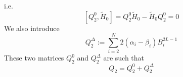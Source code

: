 \documentclass[11pt]{article}
\numberwithin{equation}{section}
\numberwithin{equation}{subsection}
\begin{document}
i.e.
\begin{equation}
\left[Q_{2}^{0},\widetilde{H}_{0}\right]=Q_{2}^{0}\widetilde{H}_{0}-\widetilde{H}_{0}Q_{2}^{0}=0
\end{equation}
We also introduce 
\begin{equation}
Q_{2}^{\Delta}:=\sum_{i=2}^{N}2(\alpha_{i}-\beta_{i})B_{i}^{2L-1}
\end{equation}
These two matrices $Q_{2}^{0}$ and $Q_{2}^{\Delta}$ are such that
\begin{equation}
Q_{2}=Q_{2}^{0}+Q_{2}^{\Delta}
\end{equation}

\end{document}
